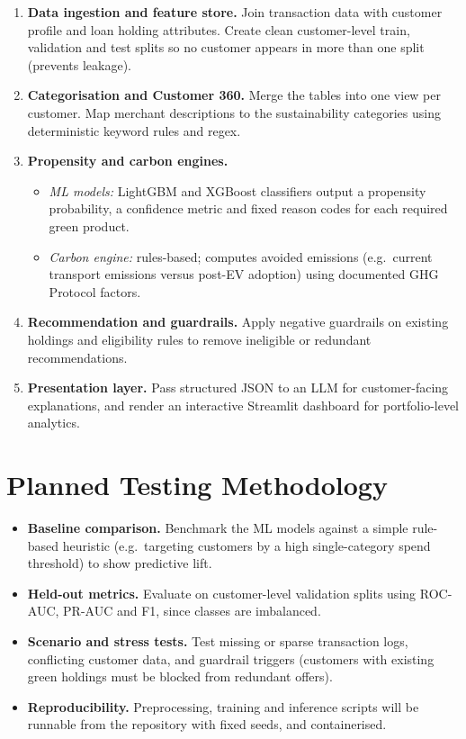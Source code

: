 \documentclass[11pt,a4paper]{article}
\begin{document}
\begin{enumerate}
  \item \textbf{Data ingestion and feature store.} Join transaction data with customer profile and loan holding attributes. Create clean customer-level train, validation and test splits so no customer appears in more than one split (prevents leakage).
  \item \textbf{Categorisation and Customer 360.} Merge the tables into one view per customer. Map merchant descriptions to the sustainability categories using deterministic keyword rules and regex.
  \item \textbf{Propensity and carbon engines.}
  \begin{itemize}
    \item \emph{ML models:} LightGBM and XGBoost classifiers output a propensity probability, a confidence metric and fixed reason codes for each required green product.
    \item \emph{Carbon engine:} rules-based; computes avoided emissions (e.g.\ current transport emissions versus post-EV adoption) using documented GHG Protocol factors.
  \end{itemize}
  \item \textbf{Recommendation and guardrails.} Apply negative guardrails on existing holdings and eligibility rules to remove ineligible or redundant recommendations.
  \item \textbf{Presentation layer.} Pass structured JSON to an LLM for customer-facing explanations, and render an interactive Streamlit dashboard for portfolio-level analytics.
\end{enumerate}

\section{Planned Testing Methodology}
\begin{itemize}
  \item \textbf{Baseline comparison.} Benchmark the ML models against a simple rule-based heuristic (e.g.\ targeting customers by a high single-category spend threshold) to show predictive lift.
  \item \textbf{Held-out metrics.} Evaluate on customer-level validation splits using ROC-AUC, PR-AUC and F1, since classes are imbalanced.
  \item \textbf{Scenario and stress tests.} Test missing or sparse transaction logs, conflicting customer data, and guardrail triggers (customers with existing green holdings must be blocked from redundant offers).
  \item \textbf{Reproducibility.} Preprocessing, training and inference scripts will be runnable from the repository with fixed seeds, and containerised.
\end{itemize}
\end{document}
